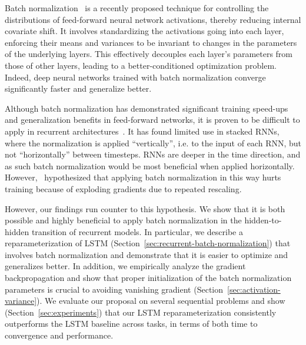 \documentclass{article} %
\begin{document}
Batch normalization~\citep{batchnorm} is a recently proposed technique for controlling the
distributions of feed-forward neural network activations, thereby reducing internal covariate
shift.  It involves standardizing the activations going into each layer, enforcing their means and
variances to be invariant to changes in the parameters of the underlying layers.
This effectively decouples each layer's parameters from those of other layers, leading to a
better-conditioned optimization problem.  Indeed, deep neural networks trained with batch
normalization converge significantly faster and generalize better.

Although batch normalization has demonstrated significant training speed-ups and generalization
benefits in feed-forward networks, it is proven to be difficult to apply in recurrent
architectures~\citep{cesar,baidu}.  It has found limited use in stacked RNNs, where the
normalization is applied ``vertically'', i.e. to the input of each RNN, but not ``horizontally''
between timesteps.  RNNs are deeper in the time direction, and as such batch normalization would
be most beneficial when applied horizontally.  However,~\citet{cesar} hypothesized that applying
batch normalization in this way hurts training because of exploding gradients due to repeated
rescaling.

However, our findings run counter to this hypothesis.  We show that it is both possible and highly
beneficial to apply batch normalization in the hidden-to-hidden transition of recurrent models.
In particular, we describe a reparameterization of LSTM
(Section~\ref{sec:recurrent-batch-normalization}) that involves batch normalization and
demonstrate that it is easier to optimize and generalizes better.  In addition, we empirically
analyze the gradient backpropagation and show that proper initialization of the batch
normalization parameters is crucial to avoiding vanishing gradient
(Section~\ref{sec:activation-variance}).  We evaluate our proposal on several sequential problems
and show (Section~\ref{sec:experiments}) that our LSTM reparameterization consistently outperforms
the LSTM baseline across tasks, in terms of both time to convergence and performance.
\end{document}
